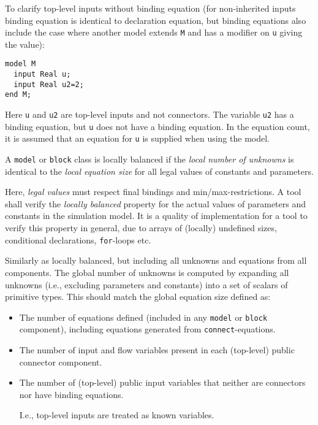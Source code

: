 \begin{nonnormative}
To clarify top-level inputs without binding equation (for
non-inherited inputs binding equation is identical to declaration
equation, but binding equations also include the case where another
model extends \lstinline!M! and has a modifier on \lstinline!u! giving the value):
\begin{lstlisting}[language=modelica]
model M
  input Real u;
  input Real u2=2;
end M;
\end{lstlisting}

Here \lstinline!u! and \lstinline!u2! are top-level inputs and not connectors. The
variable \lstinline!u2! has a binding equation, but \lstinline!u! does not have a binding
equation. In the equation count, it is assumed that an equation for \lstinline!u! is
supplied when using the model.
\end{nonnormative}

\begin{definition}
A \lstinline!model! or \lstinline!block! class is locally balanced if the \emph{local number of unknowns} is identical to the \emph{local equation size} for all legal values of constants and parameters.
\end{definition}

\begin{nonnormative}
Here, \emph{legal values} must respect final bindings and min/max-restrictions.
A tool shall verify the \emph{locally balanced} property for the actual values of parameters and constants in the simulation model.
It is a quality of implementation for a tool to verify this property in general, due to arrays of (locally) undefined sizes, conditional declarations, \lstinline!for!-loops etc.
\end{nonnormative}

\begin{definition}
Similarly as locally balanced, but including all unknowns and equations
from all components. The global number of unknowns is computed by
expanding all unknowns (i.e., excluding parameters and constants) into a
set of scalars of primitive types. This should match the global equation
size defined as:
\begin{itemize}
\item
  The number of equations defined (included in any \lstinline!model! or \lstinline!block! component), including equations generated from \lstinline!connect!-equations.
\item
  The number of input and flow variables present in each (top-level) public connector component.
\item
  The number of (top-level) public input variables that neither are connectors nor have binding equations.
  \begin{nonnormative}
  I.e., top-level inputs are treated as known variables.
  \end{nonnormative}
\end{itemize}
\end{definition}

